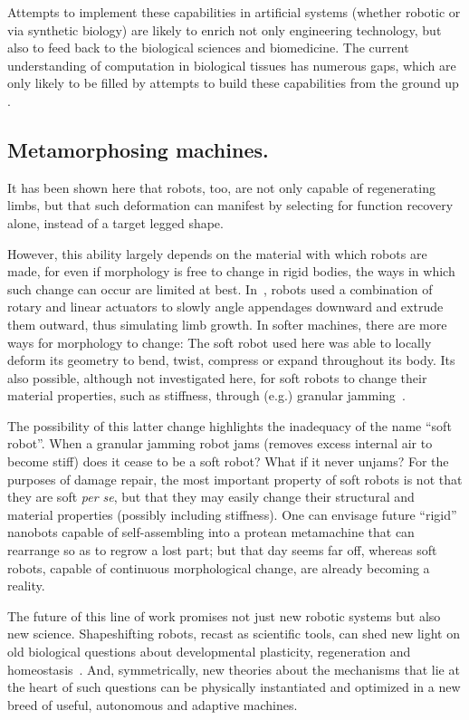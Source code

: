 Attempts to implement these capabilities in artificial systems (whether robotic or via synthetic biology) are likely to enrich not only engineering technology, but also to feed back to the biological sciences and biomedicine. 
The current understanding of computation in biological tissues has numerous gaps, which are only likely to be filled by attempts to build these capabilities from the ground up \cite{kamm2018perspective}. 


\subsection*{Metamorphosing machines.}

It has been shown here that robots, too, are not only capable of regenerating limbs, but that such deformation can manifest by selecting for function recovery alone, instead of a target legged shape.


However, this ability largely depends on the material with which robots are made, for even if morphology is free to change in rigid bodies, the ways in which such change can occur are limited at best.
In~\cite{bongard2011morphological}, robots used a combination of rotary and linear actuators to slowly angle appendages downward and extrude them outward, thus simulating limb growth.
In softer machines, there are more ways for morphology to change: 
The soft robot used here was able to locally deform its geometry to bend, twist, compress or expand throughout its body.
Its also possible, although not investigated here, for soft robots to change their material properties, such as stiffness, 
through (e.g.) granular jamming~\cite{brown2010universal,kriegman2018interoceptive}. 


The possibility of this latter change highlights the inadequacy of the name ``soft robot''.
When a granular jamming robot jams (removes excess internal air to become stiff) does it cease to be a soft robot?
What if it never unjams?
For the purposes of damage repair, the most important property of soft robots is not that they are soft \textit{per se}, but that they may easily change their structural and material properties (possibly including stiffness).
One can envisage future ``rigid'' nanobots capable of self-assembling into a protean metamachine that can rearrange so as to regrow a lost part; but that day seems far off, whereas soft robots, capable of continuous morphological change, are already becoming a reality.


The future of this line of work promises not just new robotic systems but also new science. Shapeshifting robots, recast as scientific tools, can shed new light on old biological questions about developmental plasticity, regeneration and homeostasis~\cite{kriegman2017minimal,kriegman2018morphological,lobo2012modeling}.
And, symmetrically, new theories about the mechanisms that lie at the heart of such questions can be physically instantiated and optimized in a new breed of useful, autonomous and adaptive machines.


